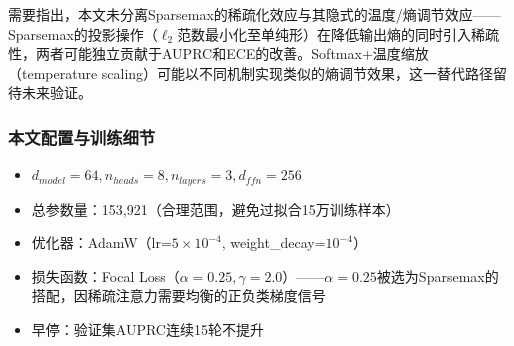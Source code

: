 需要指出，本文未分离Sparsemax的稀疏化效应与其隐式的温度/熵调节效应——Sparsemax的投影操作（$\ell_2$范数最小化至单纯形）在降低输出熵的同时引入稀疏性，两者可能独立贡献于AUPRC和ECE的改善。Softmax+温度缩放（temperature scaling）可能以不同机制实现类似的熵调节效果，这一替代路径留待未来验证。

\subsubsection{本文配置与训练细节}

\begin{itemize}
    \item $d_{model}=64, n_{heads}=8, n_{layers}=3, d_{ffn}=256$
    \item 总参数量：153,921（合理范围，避免过拟合15万训练样本）
    \item 优化器：AdamW（lr=$5 \times 10^{-4}$, weight\_decay=$10^{-4}$）
    \item 损失函数：Focal Loss（$\alpha=0.25, \gamma=2.0$）——$\alpha=0.25$被选为Sparsemax的搭配，因稀疏注意力需要均衡的正负类梯度信号
    \item 早停：验证集AUPRC连续15轮不提升
\end{itemize}
